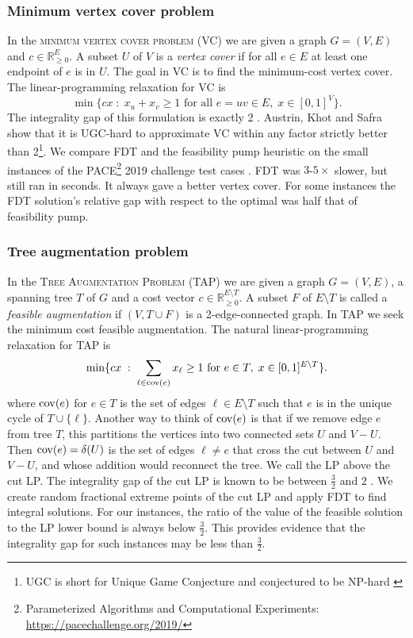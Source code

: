 \subsubsection{Minimum vertex cover problem}

In the \textsc{minimum vertex cover problem (VC)} we are given a graph $G=(V,E)$ and $c\in \mathbb{R}^E_{\geq 0}$. A subset $U$ of $V$ is a \textit{vertex cover} if for all $e\in E$ at least one endpoint of $e$ is in $U$. The goal in VC is to find the minimum-cost vertex cover. The linear-programming relaxation for VC is
\begin{equation}
\min \{cx \; : \; x_u + x_v \geq	 1 \text{ for all } e=uv \in E, \; x\in [0,1]^{V}\}.
\end{equation}
The integrality gap of this formulation is exactly 2 \cite{davids}. Austrin, Khot and Safra~\cite{UGhardVC} show that it is UGC-hard to approximate VC within any factor strictly better than 2\footnote{UGC is short for Unique Game Conjecture and conjectured to be NP-hard \cite{Khot2002OnTP}}. We compare  FDT and the feasibility pump heuristic \cite{fp1} on the small instances of the PACE\footnote{ Parameterized Algorithms and Computational Experiments: \url{https://pacechallenge.org/2019/}} 2019 challenge test cases \cite{PACE}. FDT was $3$-$5\times$ slower, but still ran in seconds. It always gave a better vertex cover. For some instances the FDT solution's relative gap with respect to the optimal was half that of feasibility pump.
\subsubsection{Tree augmentation problem}
In the \textsc{Tree Augmentation Problem (TAP)} we are given a  graph $G=(V,E)$, a spanning tree $T$ of $G$ and a cost vector $c\in \mathbb{R}^{E\setminus T}_{\geq 0}$. A subset $F$ of $E\setminus T$ is called a \textit{feasible augmentation} if $(V,T\cup F)$ is a 2-edge-connected graph. In TAP we seek the minimum cost feasible augmentation. The natural linear-programming relaxation for TAP is 
\begin{equation}\label{eq:cutLP}
\min \{cx\; : \; \sum_{\ell \in \mathrm{cov}(e)} x_{\ell} \geq 1 \text{ for } e\in T, \; x\in [0,1]^{E\setminus T}\}.
\end{equation}
where $\mathrm{cov}(e)$ for $e \in T$ is the set of edges $\ell \in E\setminus T$ such that $e$ is in the unique cycle of $T\cup \{\ell\}$. Another way to think of $\mathrm{cov}(e)$ is that if we remove edge $e$ from tree $T$, this partitions the vertices into two connected sets $U$ and $V-U$.  Then $\mathrm{cov}(e) = \delta(U)$ is the set of edges $\ell \neq e$ that cross the cut between $U$ and $V-U$, and whose addition would reconnect the tree. We call the LP above the cut LP. The integrality gap of the cut LP is known to be between $\frac{3}{2}$ \cite{32gaptap} and $2$ \cite{FJ81}. We create random fractional extreme points of the cut LP and apply FDT to find integral solutions. For our instances, the ratio of the value of the feasible solution to the LP lower bound is always below $\frac{3}{2}$. This provides evidence that the integrality gap for such instances may be less than $\frac{3}{2}$.

